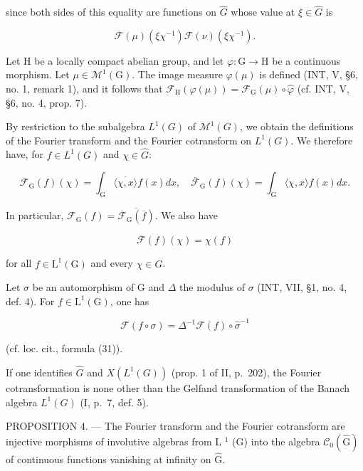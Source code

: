 since both sides of this equality are functions on \(\widehat{G}\) whose value at \(\xi\in\widehat{G}\) is

\[
\mathcal {F} (\mu) (\xi \chi^ {- 1}) \mathcal {F} (\nu) (\xi \chi^ {- 1}).
\]

Let H be a locally compact abelian group, and let \(\varphi\colon\mathrm{G}\to\mathrm{H}\) be a continuous morphism. Let \(\mu\in\mathcal{M}^{1}(\mathrm{G})\). The image measure \(\varphi(\mu)\) is defined (INT, V, §6, no. 1, remark 1), and it follows that \(\mathcal{F}_{\mathrm{H}}(\varphi(\mu))=\mathcal{F}_{\mathrm{G}}(\mu)\circ\widehat{\varphi}\) (cf. INT, V, §6, no. 4, prop. 7).

By restriction to the subalgebra \(L^{1}(G)\) of \(\mathcal{M}^{1}(G)\), we obtain the definitions of the Fourier transform and the Fourier cotransform on \(L^{1}(G)\). We therefore have, for \(f \in L^{1}(G)\) and \(\chi \in \widehat{G}\):

\[
\mathcal {F} _ {\mathrm{G}} (f) (\chi) = \int_ {\mathrm{G}} \overline {{\langle \chi , x \rangle}} f (x) d x, \quad \overline {{\mathcal {F}}} _ {\mathrm{G}} (f) (\chi) = \int_ {\mathrm{G}} \langle \chi , x \rangle f (x) d x.\tag{14}
\]

In particular, \(\mathcal{F}_{\mathrm{G}}(f) = \overline{\overline{\mathcal{F}}_{\mathrm{G}}(\overline{f})}\). We also have

\[
\overline {{\mathcal {F}}} (f) (\chi) = \chi (f)\tag{15}
\]

for all \(f \in \mathrm{L}^{1}(\mathrm{G})\) and every \(\chi \in \widehat{G}\).

Let \(\sigma\) be an automorphism of G and \(\Delta\) the modulus of \(\sigma\) (INT, VII, §1, no. 4, def. 4). For \(f \in \mathrm{L}^1(\mathrm{G})\), one has

\[
\mathcal {F} (f \circ \sigma) = \Delta^ {- 1} \mathcal {F} (f) \circ \widehat {\sigma} ^ {- 1}\tag{16}
\]

(cf. loc. cit., formula (31)).

If one identifies \(\widehat{G}\) and \(X(L^{1}(G))\) (prop. 1 of II, p.~202), the Fourier cotransformation is none other than the Gelfand transformation of the Banach algebra \(L^{1}(G)\) (I, p.~7, def. 5).

PROPOSITION 4. --- The Fourier transform and the Fourier cotransform are injective morphisms of involutive algebras from L \(^{1}\) (G) into the algebra \(\mathcal{C}_{0}(\widehat{\mathrm{G}})\) of continuous functions vanishing at infinity on \(\widehat{\mathrm{G}}\).

